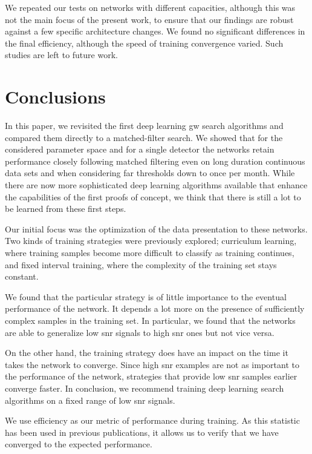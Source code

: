 We repeated our tests on networks with different capacities, although this was not the main focus of the present work, to ensure that our findings are robust against a few specific architecture changes. We found no significant differences in the final efficiency, although the speed of training convergence varied. Such studies are left to future work.

\section{Conclusions}\label{sec:conclusion}
In this paper, we revisited the first deep learning \acrshort{gw} search algorithms and compared them directly to a matched-filter search. We showed that for the considered parameter space and for a single detector the networks retain performance closely following matched filtering even on long duration continuous data sets and when considering \acrshort{far} thresholds down to once per month. While there are now more sophisticated deep learning algorithms available that enhance the capabilities of the first proofs of concept, we think that there is still a lot to be learned from these first steps.

Our initial focus was the optimization of the data presentation to these networks. Two kinds of training strategies were previously explored; curriculum learning, where training samples become more difficult to classify as training continues, and fixed interval training, where the complexity of the training set stays constant.

We found that the particular strategy is of little importance to the eventual performance of the network. It depends a lot more on the presence of sufficiently complex samples in the training set. In particular, we found that the networks are able to generalize low \acrshort{snr} signals to high \acrshort{snr} ones but not vice versa.

On the other hand, the training strategy does have an impact on the time it takes the network to converge. Since high \acrshort{snr} examples are not as important to the performance of the network, strategies that provide low \acrshort{snr} samples earlier converge faster. In conclusion, we recommend training deep learning search algorithms on a fixed range of low \acrshort{snr} signals.

We use efficiency as our metric of performance during training. As this statistic has been used in previous publications, it allows us to verify that we have converged to the expected performance.

